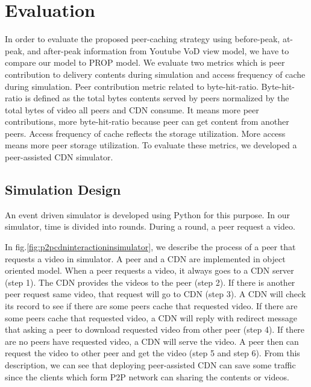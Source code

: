 \documentclass[10pt,final,journal,a4paper]{IEEEtran}
\begin{document}
\section{Evaluation}\label{evaluation}

In order to evaluate the proposed peer-caching strategy using before-peak, at-peak, and after-peak information from Youtube VoD view model, we have to compare our model to PROP model.
We evaluate two metrics which is peer contribution to delivery contents during simulation and access frequency of cache during simulation.
Peer contribution metric related to byte-hit-ratio. 
Byte-hit-ratio is defined as the total bytes contents served by peers normalized by the total bytes of video all peers and CDN consume.
It means more peer contributions, more byte-hit-ratio because peer can get content from another peers. 
Access frequency of cache reflects the storage utilization. 
More access means more peer storage utilization.  
To evaluate these metrics, we developed a peer-assisted CDN simulator. 

\subsection{Simulation Design}\label{simulationdesign}
An event driven simulator is developed using Python for this purpose.
In our simulator, time is divided into rounds. 
During a round, a peer request a video.

In fig.\ref{fig:p2pcdninteractioninsimulator}, we describe the process of a peer that requests a video in simulator.
A peer and a CDN are implemented in object oriented model. 
When a peer requests a video, it always goes to a CDN server (step 1). 
The CDN provides the videos to the peer (step 2). 
If there is another peer request same video, that request will go to CDN (step 3).  
A CDN will check its record to see if there are some peers cache that requested video.  
If there are some peers cache that requested video, a CDN will reply with redirect message that asking a peer to download requested video from other peer (step 4).
If there are no peers have requested video, a CDN will serve the video.   
A peer then can request the video to other peer and get the video (step 5 and step 6).
From this description, we can see that deploying peer-assisted CDN can save some traffic since the clients which form P2P network can sharing the contents or videos.
\end{document}

